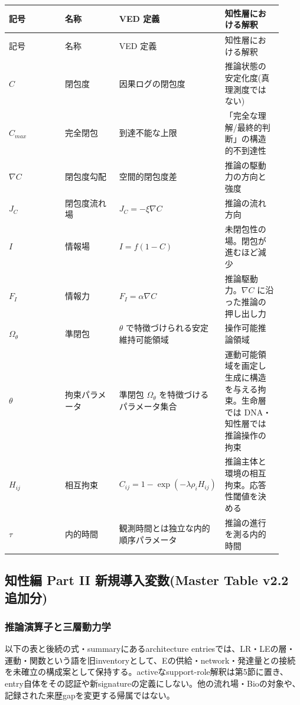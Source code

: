 \begin{longtable}{@{}p{0.23\linewidth}p{0.23\linewidth}p{0.23\linewidth}p{0.23\linewidth}@{}}
\toprule
記号 & 名称 & VED 定義 & 知性層における解釈 \\
\midrule
\endfirsthead
\toprule
記号 & 名称 & VED 定義 & 知性層における解釈 \\
\midrule
\endhead
$C$ & 閉包度 & 因果ログの閉包度 & 推論状態の安定化度(真理測度ではない) \\
$C_{max}$ & 完全閉包 & 到達不能な上限 & 「完全な理解/最終的判断」の構造的不到達性 \\
$\nabla C$ & 閉包度勾配 & 空間的閉包度差 & 推論の駆動力の方向と強度 \\
$J_C$ & 閉包度流れ場 & $J_C = -\xi \nabla C$ & 推論の流れ方向 \\
$I$ & 情報場 & $I = f(1-C)$ & 未閉包性の場。閉包が進むほど減少 \\
$F_I$ & 情報力 & $F_I = \alpha \nabla C$ & 推論駆動力。$\nabla C$ に沿った推論の押し出し力 \\
$\Omega_\theta$ & 準閉包 & $\theta$ で特徴づけられる安定維持可能領域 & 操作可能推論領域 \\
$\theta$ & 拘束パラメータ & 準閉包 $\Omega_\theta$ を特徴づけるパラメータ集合 & 運動可能領域を画定し生成に構造を与える拘束。生命層では DNA・知性層では推論操作の拘束 \\
$H_{ij}$ & 相互拘束 & $C_{ij} = 1-\exp(-\lambda \rho_i H_{ij})$ & 推論主体と環境の相互拘束。応答性閾値を決める \\
$\tau$ & 内的時間 & 観測時間とは独立な内的順序パラメータ & 推論の進行を測る内的時間 \\
\bottomrule
\end{longtable}


\bigskip


\subsection{知性編 Part II 新規導入変数(Master Table v2.2 追加分)}


\subsubsection{推論演算子と三層動力学}

以下の表と後続の式・summaryにあるarchitecture entriesでは、LR・LEの層・運動・関数という語を旧inventoryとして、Eの供給・network・発達量との接続を未確立の構成案として保持する。activeなsupport-role解釈は第5節に置き、entry自体をその認証や新signatureの定義にしない。他の流れ場・Bioの対象や、記録された来歴gapを変更する帰属ではない。


